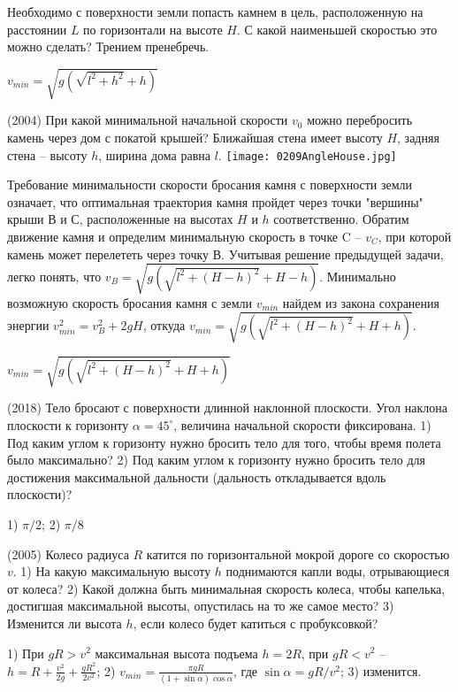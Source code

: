 \begin{ex}
Необходимо с поверхности земли попасть камнем в цель, расположенную на расстоянии $L$ по горизонтали на высоте $H$. С какой наименьшей скоростью это можно сделать? Трением пренебречь.
\begin{ans}
$v_{min} = \sqrt{g \left(\sqrt{l^2 + h^2} + h \right)}$
\end{ans}
\end{ex}

\begin{ex}
(2004) При какой минимальной начальной скорости $v_0$ можно перебросить камень через дом с покатой крышей? 
Ближайшая стена имеет высоту $H$, задняя стена -- высоту $h$, ширина дома равна $l$.
\centering
\texttt{[image: 0209AngleHouse.jpg]}
\begin{sol}
Требование минимальности скорости бросания камня с поверхности земли означает, что оптимальная траектория камня пройдет через точки "вершины" крыши В и С, расположенные на высотах $H$ и $h$ соответственно. Обратим движение камня и определим минимальную скорость в точке C -- $v_C$, при которой камень может перелететь через точку В. Учитывая решение предыдущей задачи, легко понять, что $v_B = \sqrt{g \left(\sqrt{l^2 + (H-h)^2} + H-h \right)}$. Минимально возможную скорость бросания камня с земли $v_{min}$ найдем из закона сохранения энергии $v_{min}^2 = v_B^2 + 2gH$, откуда $v_{min} = \sqrt{g \left(\sqrt{l^2 + (H-h)^2} + H + h \right)}$.
\end{sol}
\begin{ans}
$v_{min} = \sqrt{g \left(\sqrt{l^2 + (H-h)^2} + H + h \right)}$
\end{ans}
\end{ex}

\begin{ex}
(2018) Тело бросают с поверхности длинной наклонной плоскости. Угол наклона плоскости к горизонту $\alpha = 45^{\circ}$, величина начальной скорости фиксирована. 1) Под каким углом к горизонту нужно бросить тело для того, чтобы время полета было максимально? 2) Под каким углом к горизонту нужно бросить тело для достижения максимальной дальности (дальность откладывается вдоль плоскости)?
\begin{ans}
1) $\pi/2$; 2) $\pi/8$
\end{ans}
\end{ex}

\begin{ex}
(2005) Колесо радиуса $R$ катится по горизонтальной мокрой дороге со скоростью $v$. 1) На какую максимальную высоту $h$ поднимаются капли воды, отрывающиеся от колеса? 2) Какой должна быть минимальная скорость колеса, чтобы капелька, достигшая максимальной высоты, опустилась на то же самое место? 3) Изменится ли высота $h$, если колесо будет катиться с пробуксовкой?
\begin{ans}
1) При $gR > v^2$ максимальная высота подъема $h = 2R$, при $gR < v^2$ -- $h = R +\frac{v^2}{2g} + \frac{gR^2}{2v^2}$; 2) $v_{min} = \frac{\pi g R}{(1+ \sin \alpha) \cos \alpha}$, где $\sin \alpha = gR/v^2$; 3) изменится.
\end{ans}
\end{ex}


